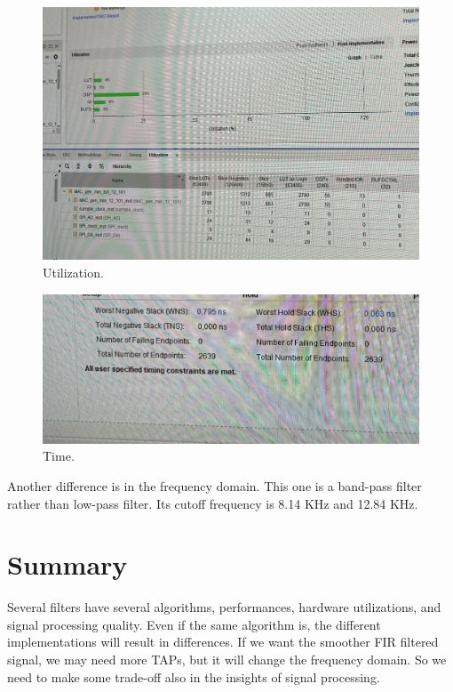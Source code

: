 \documentclass[a4paper]{article}
\begin{document}
\begin{figure}[h]
\centering
\includegraphics[width=1\textwidth]{6.jpg}
\caption{\label{fig:data}Utilization.}
\end{figure}


\begin{figure}[h]
\centering
\includegraphics[width=1\textwidth]{7.jpg}
\caption{\label{fig:data}Time.}
\end{figure}



Another difference is in the frequency domain. This one is a band-pass filter rather than low-pass filter. Its cutoff frequency is 8.14 KHz and 12.84 KHz.






\newpage

\section{Summary}

Several filters have several algorithms, performances, hardware utilizations, and signal processing quality. Even if the same algorithm is, the different implementations will result in differences. If we want the smoother FIR filtered signal, we may need more TAPs, but it will change the frequency domain. So we need to make some trade-off also in the insights of signal processing.
\end{document}
